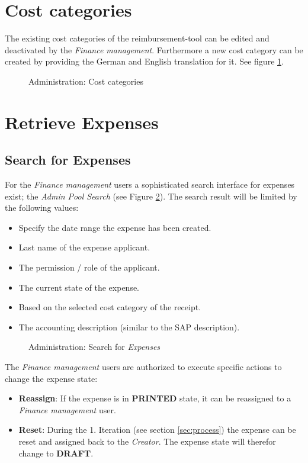 \section{Cost categories}

The existing cost categories of the reimbursement-tool can be edited and deactivated by the \textit{Finance management}. Furthermore a new cost category can be created by providing the German and English translation for it. See figure \ref{fig:admin-costcategories}.

\begin{figure}[H]
    \centering
    \caption{Administration: Cost categories}
    \label{fig:admin-costcategories}
\end{figure}

\section{Retrieve Expenses}
\subsection{Search for Expenses}

For the \textit{Finance management} users a sophisticated search interface for expenses exist; the \textit{Admin Pool Search} (see Figure \ref{fig:admin-search}). The search result will be limited by the following values:

\begin{itemize}
    \item Specify the date range the expense has been created.
    \item Last name of the expense applicant.
    \item The permission / role of the applicant.
    \item The current state of the expense.
    \item Based on the selected cost category of the receipt.
    \item The accounting description (similar to the SAP description).
\end{itemize}

\begin{figure}[H]
    \centering
    \caption{Administration: Search for \textit{Expenses}}
    \label{fig:admin-search}
\end{figure}

The \textit{Finance management} users are authorized to execute specific actions to change the expense state:
\begin{itemize}
\item \textbf{Reassign}: If the expense is in \textbf{PRINTED} state, it can be reassigned to a \textit{Finance management} user.
\item \textbf{Reset}: During the 1. Iteration (see section \ref{sec:process}) the expense can be reset and assigned back to the \textit{Creator}. The expense state will therefor change to \textbf{DRAFT}. 
\end{itemize}

